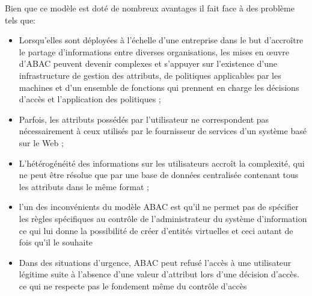 
\label{sectionInconvénientsABAC}

Bien que ce modèle est doté de nombreux avantages il fait face à des problème tels que:

\begin{itemize}
\item Lorsqu'elles sont déployées à l'échelle d'une entreprise dans le but d'accroître le partage d'informations entre diverses organisations, les mises en œuvre d'ABAC peuvent devenir complexes et s'appuyer sur l'existence d'une infrastructure de gestion des attributs, de politiques applicables par les machines et d'un ensemble de fonctions qui prennent en charge les décisions d'accès et l'application des politiques \cite{fisher00};
\item Parfois, les attributs possédés par l'utilisateur ne correspondent pas nécessairement à ceux utilisés par le fournisseur de services d'un système basé sur le Web \cite{aftab15};
\item L'hétérogénéité des informations sur les utilisateurs accroît la complexité, qui ne peut être résolue que par une base de données centralisée contenant tous les attributs dans le même format \cite{aftab15};
\item l'un des inconvénients du modèle ABAC est qu'il ne permet pas de spécifier les règles spécifiques au contrôle de l'administrateur du système d'information ce qui lui donne la possibilité de créer d'entités virtuelles et ceci autant de fois qu'il le souhaite
\item Dans des situations d'urgence, ABAC peut refusé l'accès à une utilisateur légitime suite à l'absence d'une valeur d'attribut lors d'une décision d'accès. ce qui ne respecte pas le fondement même du contrôle d'accès
\end{itemize}

